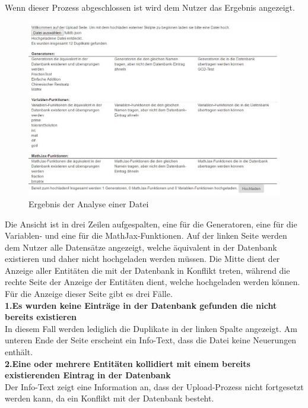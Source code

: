 Wenn dieser Prozess abgeschlossen ist wird dem Nutzer das Ergebnis angezeigt.

\begin{figure}[htp]     %
\centering
\includegraphics[width=1\textwidth]{bilder/UploadEntities} 
\caption[Ergebnis der Analyse einer Datei]{Ergebnis der Analyse einer Datei}
\end{figure} 

Die Ansicht ist in drei Zeilen aufgespalten, eine für die Generatoren, eine für die Variablen- und eine für die MathJax-Funktionen. Auf der linken Seite werden dem Nutzer alle Datensätze angezeigt, welche äquivalent in der Datenbank existieren und daher nicht hochgeladen werden müssen. Die Mitte dient der Anzeige aller Entitäten die mit der Datenbank in Konflikt treten, während die rechte Seite der Anzeige der Entitäten dient, welche hochgeladen werden können. \\

Für die Anzeige dieser Seite gibt es drei Fälle.\\

\noindent \textbf{1.Es wurden keine Einträge in der Datenbank gefunden die nicht bereits existieren } \\
In diesem Fall werden lediglich die Duplikate in der linken Spalte angezeigt. Am unteren Ende der Seite erscheint ein Info-Text, dass die Datei keine Neuerungen enthält. \\

\noindent \textbf{2.Eine oder mehrere Entitäten kollidiert mit einem bereits existierenden Eintrag in der Datenbank } \\
Der Info-Text zeigt eine Information an, dass der Upload-Prozess nicht fortgesetzt werden kann, da ein Konflikt mit der Datenbank besteht. \\

